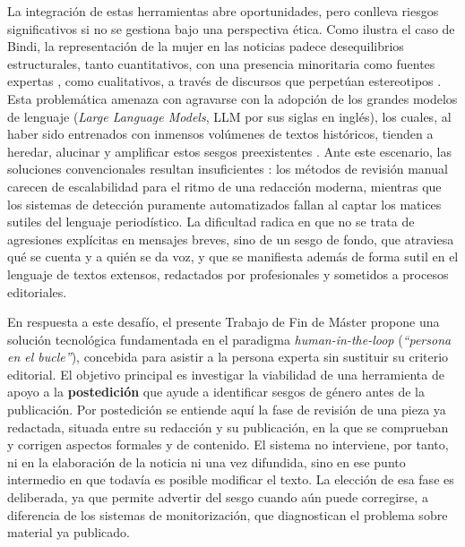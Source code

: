 La integración de estas herramientas abre oportunidades, pero conlleva riesgos significativos si no se gestiona bajo una perspectiva ética. Como ilustra el caso de Bindi, la representación de la mujer en las noticias padece desequilibrios estructurales, tanto cuantitativos, con una presencia minoritaria como fuentes expertas \cite{unwomen2025gmmp}, como cualitativos, a través de discursos que perpetúan estereotipos \cite{kotek2023}. Esta problemática amenaza con agravarse con la adopción de los grandes modelos de lenguaje (\textit{Large Language Models}, LLM por sus siglas en inglés), los cuales, al haber sido entrenados con inmensos volúmenes de textos históricos, tienden a heredar, alucinar y amplificar estos sesgos preexistentes \cite{navigli2023}. Ante este escenario, las soluciones convencionales resultan insuficientes \cite{lai2021}: los métodos de revisión manual carecen de escalabilidad para el ritmo de una redacción moderna, mientras que los sistemas de detección puramente automatizados fallan al captar los matices sutiles del lenguaje periodístico. La dificultad radica en que no se trata de agresiones explícitas en mensajes breves, sino de un sesgo de fondo, que atraviesa qué se cuenta y a quién se da voz, y que se manifiesta además de forma sutil en el lenguaje de textos extensos, redactados por profesionales y sometidos a procesos editoriales.


En respuesta a este desafío, el presente Trabajo de Fin de Máster propone una solución tecnológica fundamentada en el paradigma \textit{human-in-the-loop} (\textit{``persona en el bucle''}), concebida para asistir a la persona experta sin sustituir su criterio editorial. El objetivo principal es investigar la viabilidad de una herramienta de apoyo a la \textbf{postedición} que ayude a identificar sesgos de género antes de la publicación. Por postedición se entiende aquí la fase de revisión de una pieza ya redactada, situada entre su redacción y su publicación, en la que se comprueban y corrigen aspectos formales y de contenido. El sistema no interviene, por tanto, ni en la elaboración de la noticia ni una vez difundida, sino en ese punto intermedio en que todavía es posible modificar el texto. La elección de esa fase es deliberada, ya que permite advertir del sesgo cuando aún puede corregirse, a diferencia de los sistemas de monitorización, que diagnostican el problema sobre material ya publicado. 

